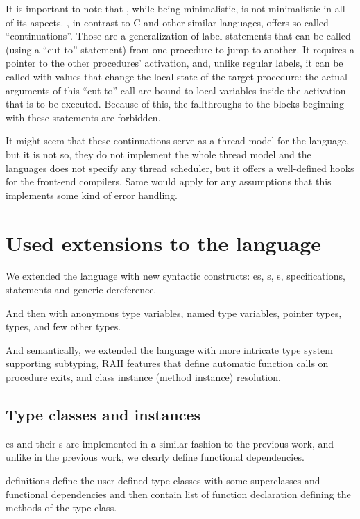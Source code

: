 It is important to note that \cmm, while being minimalistic, is not minimalistic in all of its aspects. \cmm, in contrast to C and other similar languages, offers so-called ``continuations''. Those are a generalization of label statements that can be called (using a ``cut to'' statement) from one procedure to jump to another. It requires a pointer to the other procedures' activation, and, unlike regular labels, it can be called with values that change the local state of the target procedure: the actual arguments of this ``cut to'' call are bound to local variables inside the activation that is to be executed. Because of this, the fallthroughs to the blocks beginning with these statements are forbidden.

It might seem that these continuations serve as a thread model for the language, but it is not so, they do not implement the whole thread model and the languages does not specify any thread scheduler, but it offers a well-defined hooks for the front-end compilers. Same would apply for any assumptions that this implements some kind of error handling.

\section{Used extensions to the language}

We extended the language with new syntactic constructs: es, s, s,  specifications,  statements and \li{[ptr]} generic dereference.

And then with  anonymous type variables,  named type variables,  pointer types,  types, and few other types.

And semantically, we extended the language with more intricate type system supporting subtyping, RAII features that define automatic function calls on procedure exits, and class instance (method instance) resolution.

\subsection{Type classes and instances}

es and their s are implemented in a similar fashion to the previous work, and unlike in the previous work, we clearly define functional dependencies.

 definitions define the user-defined type classes with some superclasses and functional dependencies and then contain list of function declaration defining the methods of the type class.

